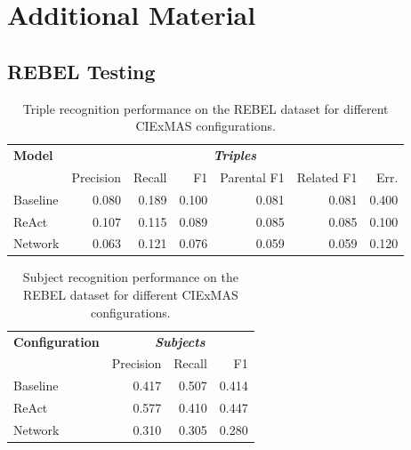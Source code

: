 \documentclass[a4paper,oneside,bibliography=totoc]{scrbook}
\begin{document}


\appendix
\chapter{Additional Material}
\label{ch:additional_material}

\section{REBEL Testing}
\label{sec:rebel_testing}

\begin{table}[h]
  \centering
  \begin{tabular}{l|rrrrrr}
    \toprule
    \textbf{Model} & \multicolumn{6}{c}{\textit{\textbf{Triples}}}                                                     \\
                   & Precision                                     & Recall & F1    & Parental F1 & Related F1 & Err.  \\
    \midrule
    Baseline       & 0.080                                         & 0.189  & 0.100 & 0.081       & 0.081      & 0.400 \\
    ReAct          & 0.107                                         & 0.115  & 0.089 & 0.085       & 0.085      & 0.100 \\
    Network        & 0.063                                         & 0.121  & 0.076 & 0.059       & 0.059      & 0.120 \\
    \bottomrule
  \end{tabular}
  \caption{Triple recognition performance on the REBEL dataset for different CIExMAS configurations.}
  \label{tab:rebel_comprehensive_results}
\end{table}

\begin{table}[h]
  \centering
  \begin{tabular}{l|rrr}
    \toprule
    \textbf{Configuration} & \multicolumn{3}{c}{\textit{\textbf{Subjects}}}                  \\
                           & Precision                                      & Recall & F1    \\
    \midrule
    Baseline               & 0.417                                          & 0.507  & 0.414 \\
    ReAct                  & 0.577                                          & 0.410  & 0.447 \\
    Network                & 0.310                                          & 0.305  & 0.280 \\
    \bottomrule
  \end{tabular}
  \caption{Subject recognition performance on the REBEL dataset for different CIExMAS configurations.}
  \label{tab:rebel_subjects}
\end{table}
\end{document}

